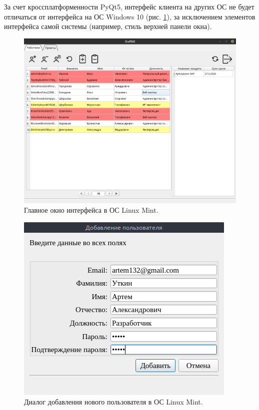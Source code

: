 За счет кроссплатформенности PyQt5, интерфейс клиента на других ОС не будет отличаться от интерфейса на ОС Windows 10 (рис. \ref{fig:main_window_linux}),
за исключением элементов интерфейса самой системы (например, стиль верхней панели окна).
\begin{figure}[h]
    \centering
    \includegraphics[width=1\linewidth]{img/main_window_linux.png}
    \caption{Главное окно интерфейса в ОС Linux Mint.}
    \label{fig:main_window_linux}
\end{figure}

\begin{figure}[h]
    \centering
    \includegraphics[width=0.5\linewidth]{img/add_user_linux.png}
    \caption{Диалог добавления нового пользователя в ОС Linux Mint.}
    \label{fig:add_user_linux}
\end{figure}

